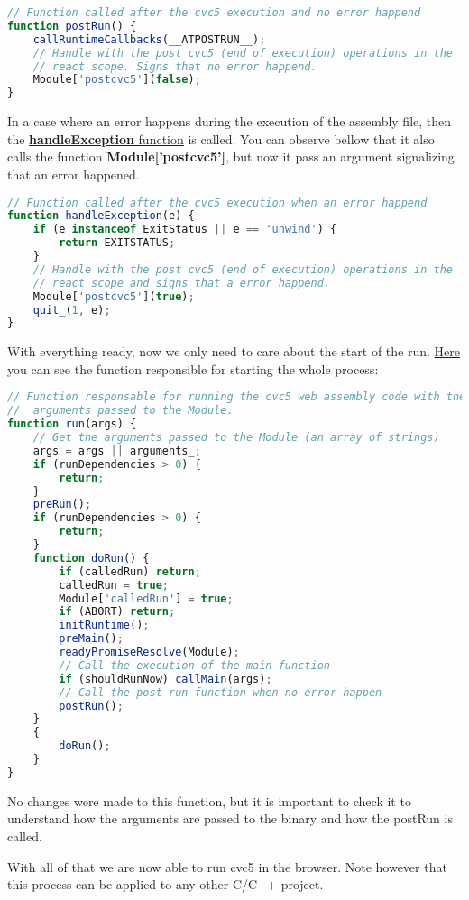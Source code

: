 \documentclass[12pt, a4paper]{article}
\begin{document}
\begin{lstlisting}[language=JavaScript]
// Function called after the cvc5 execution and no error happend
function postRun() {
    callRuntimeCallbacks(__ATPOSTRUN__);
    // Handle with the post cvc5 (end of execution) operations in the
    // react scope. Signs that no error happend.
    Module['postcvc5'](false);
}
\end{lstlisting}

In a case where an error happens during the execution of the assembly file, then the \href{https://github.com/ufmg-smite/proof-visualizer/blob/main/frontend/src/wasm/cvc5.js#L420-L429 }{\textbf{handleException} function} is called. You can observe bellow that it also calls the function \textbf{Module['postcvc5']}, but now it pass an argument signalizing that an error happened.

\begin{lstlisting}[language=JavaScript]
// Function called after the cvc5 execution when an error happend
function handleException(e) {
    if (e instanceof ExitStatus || e == 'unwind') {
        return EXITSTATUS;
    }
    // Handle with the post cvc5 (end of execution) operations in the
    // react scope and signs that a error happend.
    Module['postcvc5'](true);
    quit_(1, e);
}
\end{lstlisting}

With everything ready, now we only need to care about the start of the run. \href{https://github.com/ufmg-smite/proof-visualizer/blob/main/frontend/src/wasm/cvc5.js#L3674-L3702}{Here} you can see the function responsible for starting the whole process:

\begin{lstlisting}[language=JavaScript]
// Function responsable for running the cvc5 web assembly code with the
//  arguments passed to the Module.
function run(args) {
    // Get the arguments passed to the Module (an array of strings)
    args = args || arguments_;
    if (runDependencies > 0) {
        return;
    }
    preRun();
    if (runDependencies > 0) {
        return;
    }
    function doRun() {
        if (calledRun) return;
        calledRun = true;
        Module['calledRun'] = true;
        if (ABORT) return;
        initRuntime();
        preMain();
        readyPromiseResolve(Module);
        // Call the execution of the main function
        if (shouldRunNow) callMain(args);
        // Call the post run function when no error happen
        postRun();
    }
    {
        doRun();
    }
}
\end{lstlisting}

No changes were made to this function, but it is important to check it to understand how the arguments are passed to the binary and how the \textsf{postRun} is called.

With all of that we are now able to run cvc5 in the browser. Note however that
this process can be applied to any other C/C++ project.
\end{document}
